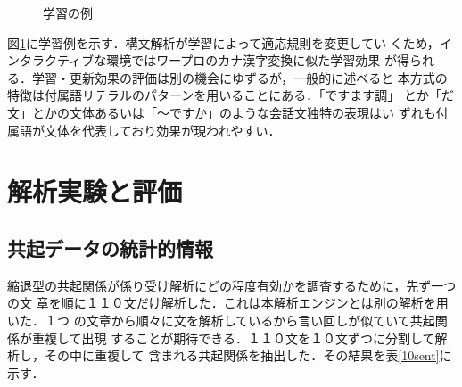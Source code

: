 \begin{itemize}
\begin{figure} [htb]
\begin{center}
\caption{学習の例}
\label{学習}
\end{center}
\end{figure}

図\ref{学習}に学習例を示す．構文解析が学習によって適応規則を変更してい
くため，インタラクティブな環境ではワープロのカナ漢字変換に似た学習効果
が得られる．学習・更新効果の評価は別の機会にゆずるが，一般的に述べると
本方式の特徴は付属語リテラルのパターンを用いることにある．「ですます調」
とか「だ文」とかの文体あるいは「〜ですか」のような会話文独特の表現はい
ずれも付属語が文体を代表しており効果が現われやすい．
\end{itemize}

\section{解析実験と評価}
\label{eval}

\subsection{共起データの統計的情報}

縮退型の共起関係が係り受け解析にどの程度有効かを調査するために，先ず一つの文
章を順に１１０文だけ解析した．これは本解析エンジンとは別の解析を用いた．１つ
の文章から順々に文を解析しているから言い回しが似ていて共起関係が重複して出現
することが期待できる．１１０文を１０文ずつに分割して解析し，その中に重複して
含まれる共起関係を抽出した．その結果を表\ref{10sent}に示す．

